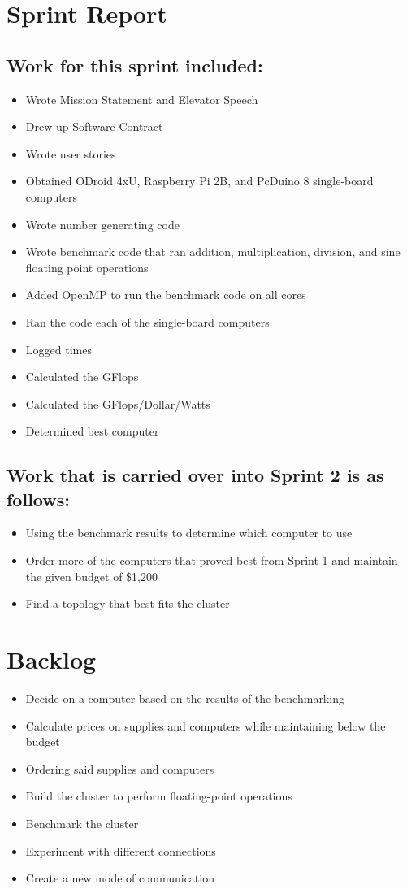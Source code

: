 \documentclass{article}
\begin{document}
\section*{Sprint Report}
\subsection*{Work for this sprint included:}
\begin{itemize}
	\item Wrote Mission Statement and Elevator Speech
	\item Drew up Software Contract
	\item Wrote user stories
	\item Obtained ODroid 4xU, Raspberry Pi 2B, and PcDuino 8 single-board computers
	\item Wrote number generating code
	\item Wrote benchmark code that ran addition, multiplication, division, and sine floating point operations
	\item Added OpenMP to run the benchmark code on all cores
	\item Ran the code each of the single-board computers
	\item Logged times
	\item Calculated the GFlops
	\item Calculated the GFlops/Dollar/Watts
	\item Determined best computer
\end{itemize}
\subsection*{Work that is carried over into Sprint 2 is as follows:}
\begin{itemize}
	\item Using the benchmark results to determine which computer to use
	\item Order more of the computers that proved best from Sprint 1 and maintain the given budget of \$1,200
	\item Find a topology that best fits the cluster
\end{itemize}

\section*{Backlog}
\begin{itemize}
	\item Decide on a computer based on the results of the benchmarking
	\item Calculate prices on supplies and computers while maintaining below the budget
	\item Ordering said supplies and computers
	\item Build the cluster to perform floating-point operations
	\item Benchmark the cluster
	\item Experiment with different connections
	\item Create a new mode of communication
\end{itemize}
\end{document}
